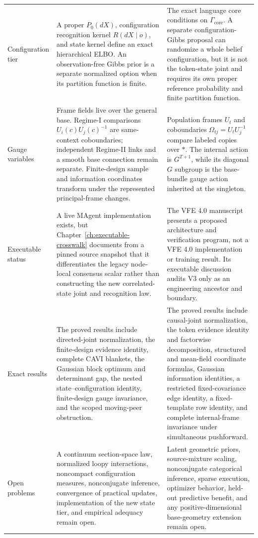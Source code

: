 \begin{longtable}{>{\raggedright\arraybackslash}p{}>{\raggedright\arraybackslash}p{}>{\raggedright\arraybackslash}p{}}
\addlinespace
Configuration tier & A proper \(P_0(dX)\), configuration recognition kernel \(R(dX\mid o)\), and state kernel define an exact hierarchical ELBO. An observation-free Gibbs prior is a separate normalized option when its partition function is finite. & The exact language core conditions on \(\Gamma_{\mathrm{core}}\). A separate configuration-Gibbs proposal can randomize a whole belief configuration, but it is not the token-state joint and requires its own proper reference probability and finite partition function. \\
\addlinespace
Gauge variables & Frame fields live over the general base. Regime-I comparisons \(U_i(c)U_j(c)^{-1}\) are same-context coboundaries; independent Regime-II links and a smooth base connection remain separate. Finite-design sample and information coordinates transform under the represented principal-frame changes. & Population frames \(U_t\) and coboundaries \(\Omega_{tj}=U_tU_j^{-1}\) compare labeled copies over \(\ast\). The internal action is \(G^{T+1}\), while its diagonal \(G\) subgroup is the base-bundle gauge action inherited at the singleton. \\
\addlinespace
Executable status & A live MAgent implementation exists, but Chapter~\ref{ch:executable-crosswalk} documents from a pinned source snapshot that it differentiates the legacy node-local consensus scalar rather than constructing the new correlated-state joint and recognition law. & The VFE 4.0 manuscript presents a proposed architecture and verification program, not a VFE 4.0 implementation or training result. Its executable discussion audits V3 only as an engineering ancestor and boundary. \\
\addlinespace
Exact results & The proved results include directed-joint normalization, the finite-design evidence identity, complete CAVI blankets, the Gaussian block optimum and determinant gap, the nested state--configuration identity, finite-design gauge invariance, and the scoped moving-peer obstruction. & The proved results include causal-joint normalization, the token evidence identity and factorwise decomposition, structured and mean-field coordinate formulas, Gaussian information identities, a restricted fixed-covariance edge identity, a fixed-template row identity, and complete internal-frame invariance under simultaneous pushforward. \\
\addlinespace
Open problems & A continuum section-space law, normalized loopy interactions, noncompact configuration measures, nonconjugate inference, convergence of practical updates, implementation of the new state tier, and empirical adequacy remain open. & Latent geometric priors, source-mixture scaling, nonconjugate categorical inference, sparse execution, optimizer behavior, held-out predictive benefit, and any positive-dimensional base-geometry extension remain open. \\
\end{longtable}
\normalsize


